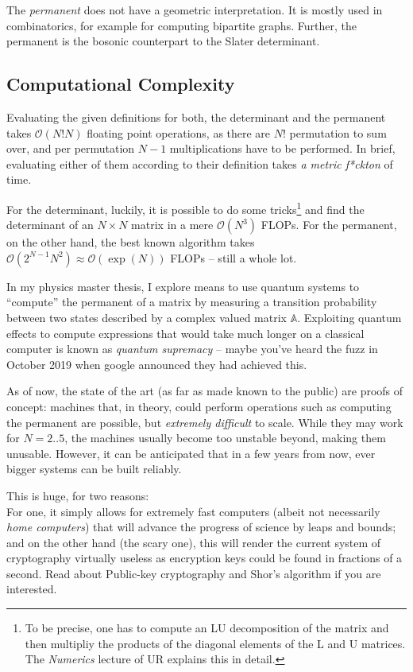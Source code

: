 \documentclass[
	english,
	fontsize=10pt,
	parskip=half,
	titlepage=true,
	DIV=12
]{scrartcl}
\begin{document}
The \emph{permanent} does not have a geometric interpretation. It is mostly used in combinatorics, for example for computing bipartite graphs. Further, the permanent is the bosonic counterpart to the Slater determinant.

\subsection{Computational Complexity}
Evaluating the given definitions for both, the determinant and the permanent takes $\mathcal{O}(N!N)$ floating point operations, as there are $N!$ permutation to sum over, and per permutation $N-1$ multiplications have to be performed. In brief, evaluating either of them according to their definition takes \emph{a metric f*ckton} of time.

For the determinant, luckily, it is possible to do some tricks\footnote{To be precise, one has to compute an LU decomposition of the matrix and then multipliy the products of the diagonal elements of the L and U matrices. The \emph{Numerics} lecture of UR explains this in detail.} and find the determinant of  an $N \times N$ matrix in a mere $\mathcal{O}(N^3)$ FLOPs. For the permanent, on the other hand, the best known algorithm takes $\mathcal{O}(2^{N-1} N^2) \approx \mathcal{O}(\exp(N))$ FLOPs -- still a whole lot.

In my physics master thesis, I explore means to use quantum systems to \enquote{compute} the permanent of a matrix by measuring a transition probability between two states described by a complex valued matrix $\mathbb{A}$. Exploiting quantum effects to compute expressions that would take much longer on a classical computer is known as \emph{quantum supremacy} -- maybe you've heard the fuzz in October 2019 when google announced they had achieved this.

As of now, the state of the art (as far as made known to the public) are proofs of concept: machines that, in theory, could perform operations such as computing the permanent are possible, but \emph{extremely difficult} to scale. While they may work for $N = 2..5$, the machines usually become too unstable beyond, making them unusable. However, it can be anticipated that in a few years from now, ever bigger systems can be built reliably.

This is huge, for two reasons:\\
For one, it simply allows for extremely fast computers (albeit not necessarily \emph{home computers}) that will advance the progress of science by leaps and bounds;\\
and on the other hand (the scary one), this will render the current system of cryptography virtually useless as encryption keys could be found in fractions of a second. Read about Public-key cryptography and Shor's algorithm if you are interested.
\end{document}
